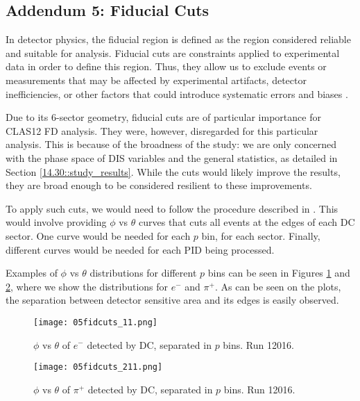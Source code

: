 \subsection*{Addendum 5: Fiducial Cuts}
    In detector physics, the fiducial region is defined as the region considered reliable and suitable for analysis.
    Fiducial cuts are constraints applied to experimental data in order to define this region.
    Thus, they allow us to exclude events or measurements that may be affected by experimental artifacts, detector inefficiencies, or other factors that could introduce systematic errors and biases \cite{leo1987}.

    Due to its 6-sector geometry, fiducial cuts are of particular importance for CLAS12 FD analysis.
    They were, however, disregarded for this particular analysis.
    This is because of the broadness of the study: we are only concerned with the phase space of DIS variables and the general statistics, as detailed in Section \ref{14.30::study_results}.
    While the cuts would likely improve the results, they are broad enough to be considered resilient to these improvements.

    To apply such cuts, we would need to follow the procedure described in \cite{zana2010}.
    This would involve providing $\phi$ vs $\theta$ curves that cuts all events at the edges of each DC sector.
    One curve would be needed for each $p$ bin, for each sector.
    Finally, different curves would be needed for each PID being processed.

    Examples of $\phi$ vs $\theta$ distributions for different $p$ bins can be seen in Figures \ref{fig::20.05::fiducial_cuts_pid11} and \ref{fig::20.05::fiducial_cuts_pid211}, where we show the distributions for $e^-$ and $\pi^+$.
    As can be seen on the plots, the separation between detector sensitive area and its edges is easily observed.

    \begin{figure}
        \centering
        \texttt{[image: 05fidcuts\_11.png]}
        \caption[$\phi$ vs $\theta$ of $e^-$ in $p$ bins]
        {$\phi$ vs $\theta$ of $e^-$ detected by DC, separated in $p$ bins.
        Run 12016.}
        \label{fig::20.05::fiducial_cuts_pid11}
    \end{figure}

    \begin{figure}
        \centering
        \texttt{[image: 05fidcuts\_211.png]}
        \caption[$\phi$ vs $\theta$ of $\pi^+$ in $p$ bins]
        {$\phi$ vs $\theta$ of $\pi^+$ detected by DC, separated in $p$ bins.
        Run 12016.}
        \label{fig::20.05::fiducial_cuts_pid211}
    \end{figure}
